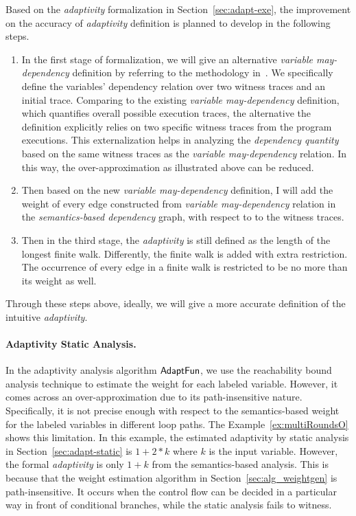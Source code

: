 Based on the \emph{adaptivity} formalization in Section~\ref{sec:adapt-exe}, the improvement on the accuracy 
of
\emph{adaptivity} definition is planned to develop in the following steps.
\begin{enumerate}
\item In the first stage of formalization, 
we will give an alternative \emph{variable may-dependency} definition 
by referring to the methodology in~\cite{Cousot19a}.
%
We specifically define the variables' dependency relation over two witness traces and an initial trace. Comparing to 
the existing \emph{variable may-dependency} definition, which quantifies overall possible execution traces, the alternative
the definition explicitly relies on two specific witness traces from the program executions.
This externalization helps in analyzing the \emph{dependency quantity} based on the same 
witness traces as the \emph{variable may-dependency} relation. In this way, the over-approximation as illustrated above
can be reduced.
%
\item Then based on the new \emph{variable may-dependency} definition,
I will add the weight of every edge constructed from 
\emph{variable may-dependency} relation in the \emph{semantics-based dependency} graph, with respect to to the witness traces.
%
\item Then in the third stage, the \emph{adaptivity} is still defined as the 
length of the longest finite walk. Differently, the finite walk is added
with extra restriction.
The occurrence of every edge in a finite walk is restricted to be no more than its weight as well.
\end{enumerate}
Through these steps above, ideally, we will give a more accurate definition of the intuitive \emph{adaptivity}.

\paragraph{Adaptivity Static Analysis.}
In the adaptivity analysis algorithm $\textsf{AdaptFun}$,
we use the reachability bound analysis technique to estimate the weight for each
labeled variable.
However,
it comes across an over-approximation due to its path-insensitive nature.
Specifically, it is not precise enough with respect to the semantics-based weight for the labeled
variables in different loop paths.
The Example~\ref{ex:multiRoundsO} shows this limitation.
In this example, the estimated adaptivity by static analysis in Section~\ref{sec:adapt-static} 
is $1 + 2*k$ where $k$ is the input variable.
However, the formal \emph{adaptivity} is only $1 + k$ from the semantics-based analysis.
This is because that the weight estimation algorithm in Section~\ref{sec:alg_weightgen} is path-insensitive.
It occurs when the control flow can be decided in a particular way in front of conditional branches, 
while the static analysis fails to witness. 

